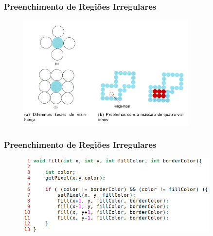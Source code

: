 \documentclass{beamer}
\begin{document}
\begin{frame}
\frametitle{Preenchimento de Regiões Irregulares}

	\begin{figure}[!h]
			\begin{center}
				\includegraphics[width=0.8\textwidth]{Figures/PreViz}
			\end{center}
	\end{figure}
	
\end{frame}


\begin{frame}
\frametitle{Preenchimento de Regiões Irregulares}

	\begin{figure}[!h]
			\begin{flushleft}
				\includegraphics[width=0.9\textwidth]{Figures/AlgFil}
			\end{flushleft}
	\end{figure}
	
\end{frame}
\end{document}
